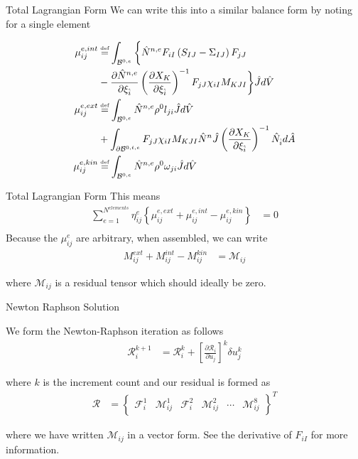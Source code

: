 \documentclass[11pt]{beamer}
\newcommand\defeq{\mathrel{\stackrel{\makebox[0pt]{\mbox{\normalfont\tiny def}}}{=}}}
\begin{document}
\begin{frame}{Total Lagrangian Form}
We can write this into a similar balance form by noting for a single element

\begin{align*}
\mu_{ij}^{e,int} &\defeq \int_{\mathcal{B}^{0,e}}  \bigg\{\hat{N}^{n,e}F_{iI} \left(S_{IJ}-\Sigma_{IJ}\right) F_{jJ}\\
& - \frac{\partial \hat{N}^{n,e}}{\partial \xi_{\hat{i}}} \left(\frac{\partial X_{K}}{\partial \xi_{\hat{i}}}\right)^{-1} F_{jJ} \chi_{iI}  M_{KJI} \bigg\} \hat{J} d\hat{V}\\
\mu_{ij}^{e,ext} &\defeq \int_{\mathcal{B}^{0,e}}  \hat{N}^{n,e} \rho^0 l_{ji} \hat{J}d\hat{V}\\
& + \int_{\partial \mathcal{B}^{0,t,e}} F_{jJ} \chi_{iI}  M_{KJI} \hat{N}^n \hat{J} \left(\frac{\partial X_{K}}{\partial \xi_{\hat{i}}}\right)^{-1} \hat{N}_{\hat{i}} d\hat{A}\\
\mu_{ij}^{e,kin} &\defeq \int_{\mathcal{B}^{0,e}}  \hat{N}^{n,e} \rho^0 \omega_{ji} \hat{J}d\hat{V}\\
\end{align*}
\end{frame}

\begin{frame}{Total Lagrangian Form}
This means
\begin{align*}
\sum_{e=1}^{N^{elements}} \eta_{ij}^{e} \left\{ \mu_{ij}^{e,ext} + \mu_{ij}^{e,int} - \mu_{ij}^{e,kin}\right\} &= 0\\
\end{align*}
Because the $\mu_{ij}^e$ are arbitrary, when assembled, we can write
\begin{align*}
M_{ij}^{ext} + M_{ij}^{int} - M_{ij}^{kin} &= \mathcal{M}_{ij}
\end{align*}

where $\mathcal{M}_{ij}$ is a residual tensor which should ideally be zero.

\end{frame}

\begin{frame}{Newton Raphson Solution}

We form the Newton-Raphson iteration as follows
\begin{align*}
\mathcal{R}^{k+1}_{i} &= \mathcal{R}^k_i + \left[\frac{\partial \mathcal{R}_i}{\partial u_j} \right]^k\delta u_j^k
\end{align*}

where $k$ is the increment count and our residual is formed as
\begin{align*}
\mathcal{R} &= \left\{ \begin{array}{cccccc}
\mathcal{F}_i^1 & \mathcal{M}_{ij}^1 & \mathcal{F}_i^2 & \mathcal{M}_{ij}^2 & \cdots & \mathcal{M}_{ij}^8
\end{array}\right\}^T
\end{align*}

where we have written $\mathcal{M}_{ij}$ in a vector form. See the derivative of $F_{iI}$ for more information.

\end{frame}
\end{document}
